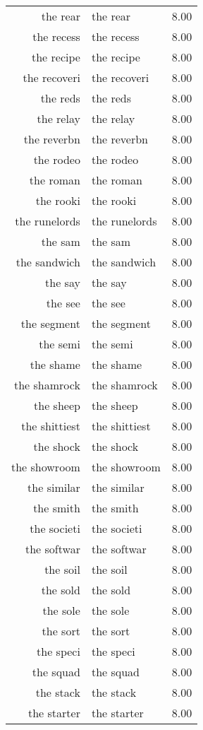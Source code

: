 \begin{table}[ht]
\begin{tabular}{rlr}
  the rear & the rear & 8.00 \\ 
  the recess & the recess & 8.00 \\ 
  the recipe & the recipe & 8.00 \\ 
  the recoveri & the recoveri & 8.00 \\ 
  the reds & the reds & 8.00 \\ 
  the relay & the relay & 8.00 \\ 
  the reverbn & the reverbn & 8.00 \\ 
  the rodeo & the rodeo & 8.00 \\ 
  the roman & the roman & 8.00 \\ 
  the rooki & the rooki & 8.00 \\ 
  the runelords & the runelords & 8.00 \\ 
  the sam & the sam & 8.00 \\ 
  the sandwich & the sandwich & 8.00 \\ 
  the say & the say & 8.00 \\ 
  the see & the see & 8.00 \\ 
  the segment & the segment & 8.00 \\ 
  the semi & the semi & 8.00 \\ 
  the shame & the shame & 8.00 \\ 
  the shamrock & the shamrock & 8.00 \\ 
  the sheep & the sheep & 8.00 \\ 
  the shittiest & the shittiest & 8.00 \\ 
  the shock & the shock & 8.00 \\ 
  the showroom & the showroom & 8.00 \\ 
  the similar & the similar & 8.00 \\ 
  the smith & the smith & 8.00 \\ 
  the societi & the societi & 8.00 \\ 
  the softwar & the softwar & 8.00 \\ 
  the soil & the soil & 8.00 \\ 
  the sold & the sold & 8.00 \\ 
  the sole & the sole & 8.00 \\ 
  the sort & the sort & 8.00 \\ 
  the speci & the speci & 8.00 \\ 
  the squad & the squad & 8.00 \\ 
  the stack & the stack & 8.00 \\ 
  the starter & the starter & 8.00 \\ 

\end{tabular}
\end{table}
